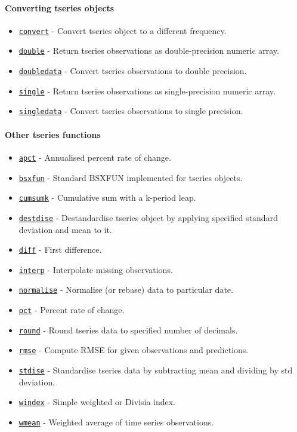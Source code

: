\paragraph{Converting tseries objects}

\begin{itemize}
\itemsep1pt\parskip0pt
\item
  \href{tseries/convert}{\texttt{convert}} - Convert tseries object to a
  different frequency.
\item
  \href{tseries/double}{\texttt{double}} - Return tseries observations
  as double-precision numeric array.
\item
  \href{tseries/doubledata}{\texttt{doubledata}} - Convert tseries
  observations to double precision.
\item
  \href{tseries/single}{\texttt{single}} - Return tseries observations
  as single-precision numeric array.
\item
  \href{tseries/singledata}{\texttt{singledata}} - Convert tseries
  observations to single precision.
\end{itemize}

\paragraph{Other tseries functions}

\begin{itemize}
\itemsep1pt\parskip0pt
\item
  \href{tseries/apct}{\texttt{apct}} - Annualised percent rate of
  change.
\item
  \href{tseries/bsxfun}{\texttt{bsxfun}} - Standard BSXFUN implemented
  for tseries objects.
\item
  \href{tseries/cumsumk}{\texttt{cumsumk}} - Cumulative sum with a
  k-period leap.
\item
  \href{tseries/destdise}{\texttt{destdise}} - Destandardise tseries
  object by applying specified standard deviation and mean to it.
\item
  \href{tseries/diff}{\texttt{diff}} - First difference.
\item
  \href{tseries/interp}{\texttt{interp}} - Interpolate missing
  observations.
\item
  \href{tseries/normalise}{\texttt{normalise}} - Normalise (or rebase)
  data to particular date.
\item
  \href{tseries/pct}{\texttt{pct}} - Percent rate of change.
\item
  \href{tseries/round}{\texttt{round}} - Round tseries data to specified
  number of decimals.
\item
  \href{tseries/rmse}{\texttt{rmse}} - Compute RMSE for given
  observations and predictions.
\item
  \href{tseries/stdise}{\texttt{stdise}} - Standardise tseries data by
  subtracting mean and dividing by std deviation.
\item
  \href{tseries/windex}{\texttt{windex}} - Simple weighted or Divisia
  index.
\item
  \href{tseries/wmean}{\texttt{wmean}} - Weighted average of time series
  observations.
\end{itemize}

